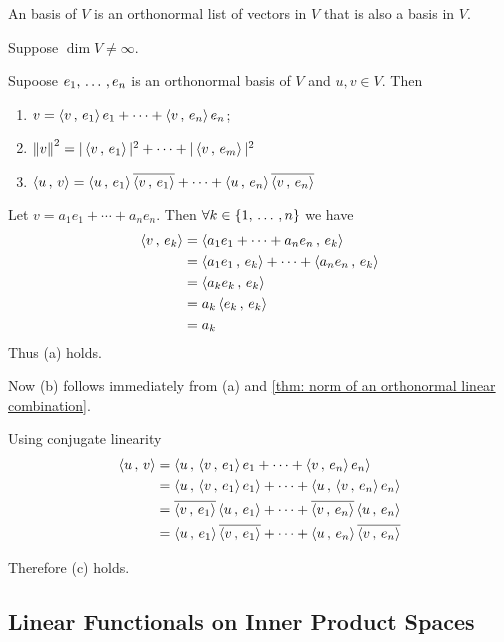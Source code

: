 \begin{mydef}
  An  basis of $V$ is an orthonormal list of vectors in $V$ that is also a basis in $V$.
\end{mydef}

\begin{mydef}
  Suppose $\dim V \neq \infty$.
\end{mydef}

\begin{thm}
  \label{thm: writing a vector as a linear combination of an orthonormal basis}

  Supoose $e_1, \ddd, e_n$ is an orthonormal basis of $V$ and $u,v \in V$. Then
  \begin{enumerate}[label=(\alph*)]
    \item $v=\ip{v}{e_1}e_1 + \cdots + \ip{v}{e_n}e_n$;
    \item $\norm{v}^2 = |\ip{v}{e_1}|^2 + \cdots + |\ip{v}{e_m}|^2$
    \item $\ip{u}{v} = \ip{u}{e_1} \overline{\ip{v}{e_1}} + \cdots + \ip{u}{e_n} \overline{\ip{v}{e_n}}$
  \end{enumerate}
\end{thm}
\begin{prf}
  Let $v=a_1 e_1 + \cdots + a_n e_n$. Then $\forall k \in \{1, \ddd, n\}$ we have
  \begin{equation}
    \begin{aligned}
      \ip{v}{e_k}
      &=\ip{a_1 e_1 + \cdots + a_n e_n}{e_k} \\
      &=\ip{a_1 e_1}{e_k} + \cdots + \ip{a_n e_n}{e_k}\\
      &=\ip{a_ke_k}{e_k} \\
      &= a_k\ip{e_k}{e_k} \\
      &=a_k
    \end{aligned}
  \end{equation}
  Thus (a) holds.

  Now (b) follows immediately from (a) and \ref{thm: norm of an orthonormal linear combination}.

  Using conjugate linearity
  \begin{equation}
    \begin{aligned}
      \ip{u}{v}
      &=\ip{u}{\ip{v}{e_1}e_1 + \cdots + \ip{v}{e_n}e_n} \\
      &= \ip{u}{\ip{v}{e_1}e_1} + \cdots + \ip{u}{\ip{v}{e_n}e_n} \\
      &= \overline{\ip{v}{e_1}}\ip{u}{e_1} + \cdots + \overline{\ip{v}{e_n}}\ip{u}{e_n} \\
      &= \ip{u}{e_1}\overline{\ip{v}{e_1}} + \cdots + \ip{u}{e_n}\overline{\ip{v}{e_n}}
    \end{aligned}
  \end{equation}

  Therefore (c) holds.
\end{prf}

\subsection{Linear Functionals on Inner Product Spaces}